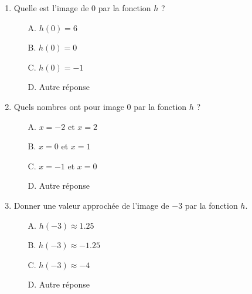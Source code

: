 \documentclass{article}
\begin{document}
\begin{enumerate}[label=\textbf{Question \arabic*.}]
    \item Quelle est l'image de \(0\) par la fonction \(h\) ?
    \vspace{0.5cm} 
    \begin{itemize}[label=]
        \item[A.] \( h(0) = 6 \) \vspace{0.5cm} 
        \item[B.] \( h(0) = 0 \) \vspace{0.5cm} 
        \item[C.] \( h(0) = -1 \) \vspace{0.5cm} 
        \item[D.] Autre réponse
    \end{itemize}
    \vspace{0.5cm} 
    
    \item Quels nombres ont pour image \(0\) par la fonction \(h\) ?
    \vspace{0.5cm}
    \begin{itemize}[label=]
        \item[A.] \( x = -2 \) et \( x = 2 \) \vspace{0.5cm} 
        \item[B.] \( x = 0 \) et \( x = 1 \) \vspace{0.5cm} 
        \item[C.] \( x = -1 \) et \( x = 0 \) \vspace{0.5cm} 
        \item[D.] Autre réponse
    \end{itemize}
    \vspace{0.5cm} 
    
    \item Donner une valeur approchée de l'image de \(-3\) par la fonction \(h\).
    \vspace{0.5cm}
    \begin{itemize}[label=]
        \item[A.] \( h(-3) \approx 1.25 \) \vspace{0.5cm} 
        \item[B.] \( h(-3) \approx -1.25 \) \vspace{0.5cm} 
        \item[C.] \( h(-3) \approx -4 \) \vspace{0.5cm} 
        \item[D.] Autre réponse
    \end{itemize}
\end{enumerate}
\end{document}
